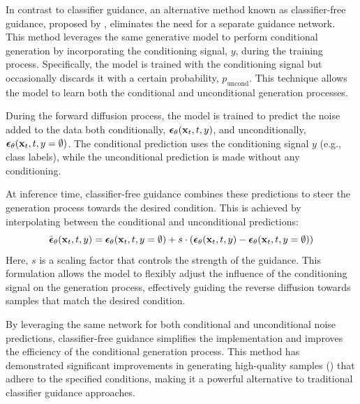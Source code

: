 In contrast to classifier guidance, an alternative method known as classifier-free guidance, proposed by \cite{ho2021classifierfree}, eliminates the need for a separate guidance network. This method leverages the same generative model to perform conditional generation by incorporating the conditioning signal, $y$, during the training process. Specifically, the model is trained with the conditioning signal but occasionally discards it with a certain probability, $p_\text{uncond}$. This technique allows the model to learn both the conditional and unconditional generation processes.

During the forward diffusion process, the model is trained to predict the noise added to the data both conditionally, $\boldsymbol{\mathbf{\epsilon}}_\theta(\boldsymbol{\mathbf{x}}_t, t, y)$, and unconditionally, $\boldsymbol{\mathbf{\epsilon}}_\theta(\boldsymbol{\mathbf{x}}_t, t, y = \emptyset)$. The conditional prediction uses the conditioning signal $y$ (e.g., class labels), while the unconditional prediction is made without any conditioning.

At inference time, classifier-free guidance combines these predictions to steer the generation process towards the desired condition. This is achieved by interpolating between the conditional and unconditional predictions:
\begin{equation}
\bar{\boldsymbol{\mathbf{\epsilon}}}_\theta(\boldsymbol{\mathbf{x}}_t, t, y) = \boldsymbol{\mathbf{\epsilon}}_\theta(\boldsymbol{\mathbf{x}}_t, t, y = \emptyset) + s \cdot (\boldsymbol{\mathbf{\epsilon}}_\theta(\boldsymbol{\mathbf{x}}_t, t, y) - \boldsymbol{\mathbf{\epsilon}}_\theta(\boldsymbol{\mathbf{x}}_t, t, y = \emptyset))
\end{equation}
Here, $s$ is a scaling factor that controls the strength of the guidance. This formulation allows the model to flexibly adjust the influence of the conditioning signal on the generation process, effectively guiding the reverse diffusion towards samples that match the desired condition.

By leveraging the same network for both conditional and unconditional noise predictions, classifier-free guidance simplifies the implementation and improves the efficiency of the conditional generation process. This method has demonstrated significant improvements in generating high-quality samples (\cite{ho2021classifierfree}) that adhere to the specified conditions, making it a powerful alternative to traditional classifier guidance approaches.


